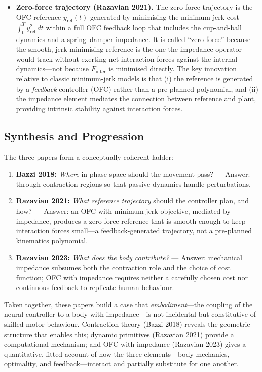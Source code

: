 \documentclass[11pt]{article}
\begin{document}
\begin{itemize}[leftmargin=1.2em]
  \item \textbf{Zero-force trajectory (Razavian 2021).}
  The zero-force trajectory is the OFC reference $y_{\text{ref}}(t)$ generated by minimising the minimum-jerk cost $\int_0^T \dddot{y}_{\text{ref}}^2\,dt$ within a full OFC feedback loop that includes the cup-and-ball dynamics and a spring--damper impedance.  It is called ``zero-force'' because the smooth, jerk-minimising reference is the one the impedance operator would track without exerting net interaction forces against the internal dynamics---not because $F_{\text{inter}}$ is minimised directly.  The key innovation relative to classic minimum-jerk models is that (i) the reference is generated by a \emph{feedback} controller (OFC) rather than a pre-planned polynomial, and (ii) the impedance element mediates the connection between reference and plant, providing intrinsic stability against interaction forces.
\end{itemize}

\subsection*{Synthesis and Progression}

The three papers form a conceptually coherent ladder:
\begin{enumerate}[leftmargin=1.5em]
  \item \textbf{Bazzi 2018:} \emph{Where} in phase space should the movement pass? --- Answer: through contraction regions so that passive dynamics handle perturbations.
  \item \textbf{Razavian 2021:} \emph{What reference trajectory} should the controller plan, and how? --- Answer: an OFC with minimum-jerk objective, mediated by impedance, produces a zero-force reference that is smooth enough to keep interaction forces small---a feedback-generated trajectory, not a pre-planned kinematics polynomial.
  \item \textbf{Razavian 2023:} \emph{What does the body contribute?} --- Answer: mechanical impedance subsumes both the contraction role and the choice of cost function; OFC with impedance requires neither a carefully chosen cost nor continuous feedback to replicate human behaviour.
\end{enumerate}

Taken together, these papers build a case that \emph{embodiment}---the coupling of the neural controller to a body with impedance---is not incidental but constitutive of skilled motor behaviour.  Contraction theory (Bazzi 2018) reveals the geometric structure that enables this; dynamic primitives (Razavian 2021) provide a computational mechanism; and OFC with impedance (Razavian 2023) gives a quantitative, fitted account of how the three elements---body mechanics, optimality, and feedback---interact and partially substitute for one another.
\end{document}
